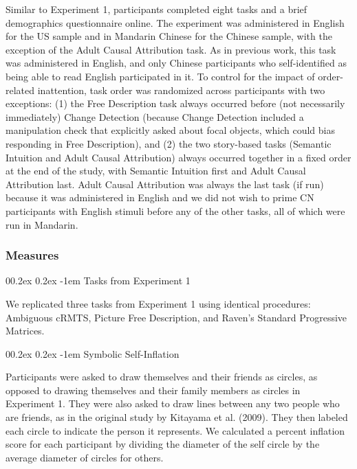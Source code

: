 \documentclass[
  man,floatsintext]{apa6}
\makeatletter
\let\oldparagraph\paragraph
\renewcommand{\paragraph}[1]{\oldparagraph{#1}\mbox{}}
\renewcommand{\paragraph}{\@startsection{paragraph}{4}{\parindent}%
  {0\baselineskip \@plus 0.2ex \@minus 0.2ex}%
  {-1em}%
  {\normalfont\normalsize\bfseries\itshape\typesectitle}}
\makeatother
\begin{document}
Similar to Experiment 1, participants completed eight tasks and a brief demographics questionnaire online. The experiment was administered in English for the US sample and in Mandarin Chinese for the Chinese sample, with the exception of the Adult Causal Attribution task. As in previous work, this task was administered in English, and only Chinese participants who self-identified as being able to read English participated in it. To control for the impact of order-related inattention, task order was randomized across participants with two exceptions: (1) the Free Description task always occurred before (not necessarily immediately) Change Detection (because Change Detection included a manipulation check that explicitly asked about focal objects, which could bias responding in Free Description), and (2) the two story-based tasks (Semantic Intuition and Adult Causal Attribution) always occurred together in a fixed order at the end of the study, with Semantic Intuition first and Adult Causal Attribution last. Adult Causal Attribution was always the last task (if run) because it was administered in English and we did not wish to prime CN participants with English stimuli before any of the other tasks, all of which were run in Mandarin.

\hypertarget{measures-1}{%
\subsubsection{Measures}\label{measures-1}}

\hypertarget{tasks-from-experiment-1}{%
\paragraph{Tasks from Experiment 1}\label{tasks-from-experiment-1}}

We replicated three tasks from Experiment 1 using identical procedures: Ambiguous cRMTS, Picture Free Description, and Raven's Standard Progressive Matrices.

\hypertarget{symbolic-self-inflation-2}{%
\paragraph{Symbolic Self-Inflation}\label{symbolic-self-inflation-2}}

Participants were asked to draw themselves and their friends as circles, as opposed to drawing themselves and their family members as circles in Experiment 1. They were also asked to draw lines between any two people who are friends, as in the original study by Kitayama et al. (2009). They then labeled each circle to indicate the person it represents. We calculated a percent inflation score for each participant by dividing the diameter of the self circle by the average diameter of circles for others.
\end{document}
